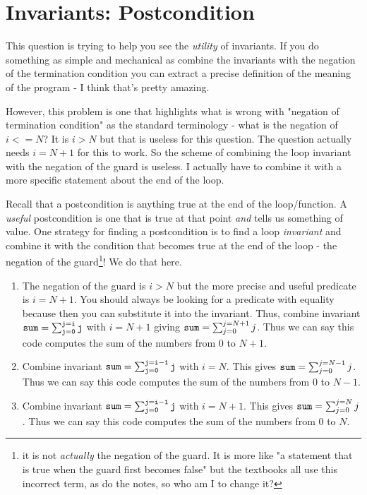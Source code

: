 \documentclass[twoside=false,DIV=14]{scrartcl}
\begin{document}
\section{Invariants: Postcondition}
This question is trying to help you see the \emph{utility} of invariants.  If you do something as simple and mechanical as combine the invariants with the negation of the termination condition you can extract a precise definition of the meaning of the program - I think that's pretty amazing.

However, this problem is one that highlights what is wrong with "negation of termination condition" as the standard terminology - what is the negation of $ i <= N$?  It is $i > N$ but that is useless for this question. The question actually needs $i = N + 1$ for this to work. So the scheme of combining the loop invariant with the negation of the guard is useless.  I actually have to combine it with a more specific statement about the end of the loop.

Recall that a postcondition is anything true at the end of the loop/function.  A \emph{useful} postcondition is one that is true at that point \emph{and} tells us something of value.  One strategy for finding a postcondition is to find a loop \emph{invariant} and combine it with the condition that becomes true at the end of the loop - the negation of the guard\footnote{it is not \emph{actually} the negation of the guard.  It is more like "a statement that is true when the guard first becomes false" but the textbooks all use this incorrect term, as do the notes, so who am I to change it?}!  We do that here.
\begin{enumerate}
\item The negation of the guard is $i > N$ but the more precise and useful predicate is $i = N + 1$.  You should always be looking for a predicate with equality because then you can substitute it into the invariant.  Thus, combine invariant ${\tt sum = \sum_{j=0}^{j=i} j}$ with $i = N+1$ giving ${\tt sum} = \sum_{j=0}^{j=N+1} j $.  Thus we can say this code computes the sum of the numbers from $0$ to $N+1$.
\item Combine  invariant ${\tt sum = \sum_{j=0}^{j=i-1} j}$ with $i = N$. This gives ${\tt sum} = \sum_{j=0}^{j=N-1} j $.  Thus we can say this code computes the sum of the numbers from $0$ to $N-1$.
\item Combine  invariant ${\tt sum = \sum_{j=0}^{j=i-1} j}$ with $i = N + 1$. This gives ${\tt sum} = \sum_{j=0}^{j=N} j $.  Thus we can say this code computes the sum of the numbers from $0$ to $N$.
\end{enumerate}
\end{document}
